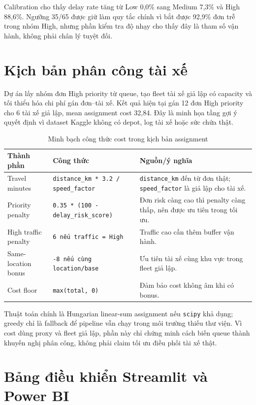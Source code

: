 \documentclass[12pt,a4paper,oneside]{report}
\newcommand{\code}[1]{\nolinkurl{#1}}
\begin{document}
Calibration cho thấy delay rate tăng từ Low 0,0\% sang Medium 7,3\% và High
88,6\%. Ngưỡng 35/65 được giữ làm quy tắc chính vì bắt được 92,9\% đơn trễ trong
nhóm High, nhưng phần kiểm tra độ nhạy cho thấy đây là tham số vận hành, không phải
chân lý tuyệt đối.

\section{Kịch bản phân công tài xế}

Dự án lấy nhóm đơn High priority từ queue, tạo fleet tài xế giả lập có capacity
và tối thiểu hóa chi phí gán đơn--tài xế. Kết quả hiện tại gán 12 đơn High
priority cho 6 tài xế giả lập, mean assignment cost 32,84. Đây là minh họa tầng
gợi ý quyết định vì dataset Kaggle không có depot, log tài xế hoặc sức chứa
thật.

\begin{table}[H]
\centering
\small
\caption{Minh bạch công thức cost trong kịch bản assignment}
\begin{tabularx}{\textwidth}{p{3.4cm}p{5.6cm}X}
\toprule
Thành phần & Công thức & Nguồn/ý nghĩa\\
\midrule
Travel minutes & \code{distance\_km * 3.2 / speed\_factor} &
\code{distance\_km} đến từ đơn thật; \code{speed\_factor} là giả lập cho tài xế.\\
Priority penalty & \code{0.35 * (100 - delay\_risk\_score)} &
Đơn risk càng cao thì penalty càng thấp, nên được ưu tiên trong tối ưu.\\
High traffic penalty & \code{6 nếu traffic = High} &
Traffic cao cần thêm buffer vận hành.\\
Same-location bonus & \code{-8 nếu cùng location/base} &
Ưu tiên tài xế cùng khu vực trong fleet giả lập.\\
Cost floor & \code{max(total, 0)} &
Đảm bảo cost không âm khi có bonus.\\
\bottomrule
\end{tabularx}
\end{table}

Thuật toán chính là Hungarian linear-sum assignment nếu \code{scipy} khả dụng;
greedy chỉ là fallback để pipeline vẫn chạy trong môi trường thiếu thư viện.
Vì cost dùng proxy và fleet giả lập, phần này chỉ chứng minh cách biến queue
thành khuyến nghị phân công, không phải claim tối ưu điều phối tài xế thật.

\section{Bảng điều khiển Streamlit và Power BI}
\end{document}
